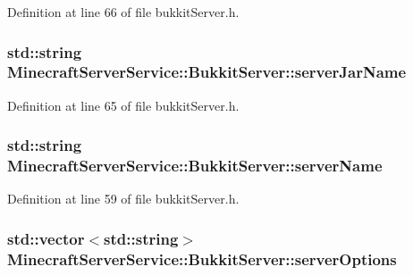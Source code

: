 Definition at line 66 of file bukkit\+Server.\+h.

\subsubsection[{\texorpdfstring{server\+Jar\+Name}{serverJarName}}]{\setlength{\rightskip}{0pt plus 5cm}std\+::string Minecraft\+Server\+Service\+::\+Bukkit\+Server\+::server\+Jar\+Name\hspace{0.3cm}{\ttfamily [protected]}}\hypertarget{class_minecraft_server_service_1_1_bukkit_server_a715fdfd8db6b4bfd3f0da088193c4c39}{}\label{class_minecraft_server_service_1_1_bukkit_server_a715fdfd8db6b4bfd3f0da088193c4c39}


Definition at line 65 of file bukkit\+Server.\+h.

\subsubsection[{\texorpdfstring{server\+Name}{serverName}}]{\setlength{\rightskip}{0pt plus 5cm}std\+::string Minecraft\+Server\+Service\+::\+Bukkit\+Server\+::server\+Name}\hypertarget{class_minecraft_server_service_1_1_bukkit_server_abd8434ba92225f8b6d57c3cffd801f8b}{}\label{class_minecraft_server_service_1_1_bukkit_server_abd8434ba92225f8b6d57c3cffd801f8b}


Definition at line 59 of file bukkit\+Server.\+h.

\subsubsection[{\texorpdfstring{server\+Options}{serverOptions}}]{\setlength{\rightskip}{0pt plus 5cm}std\+::vector$<$std\+::string$>$ Minecraft\+Server\+Service\+::\+Bukkit\+Server\+::server\+Options\hspace{0.3cm}{\ttfamily [protected]}}\hypertarget{class_minecraft_server_service_1_1_bukkit_server_a21e5a43e4dd5fbf5037a6017683b2301}{}\label{class_minecraft_server_service_1_1_bukkit_server_a21e5a43e4dd5fbf5037a6017683b2301}


